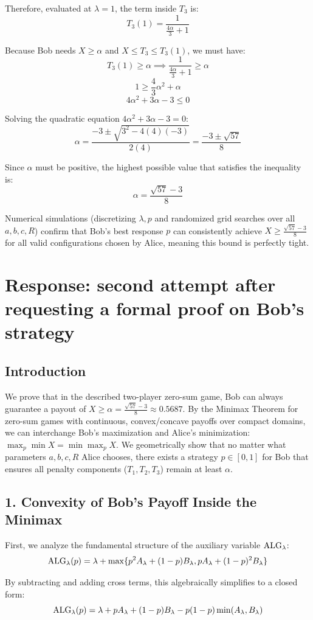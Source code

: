 \documentclass[11pt]{article}
\newcommand{\ALG}{\textnormal{ALG}}
\begin{document}
Therefore, evaluated at $\lambda = 1$, the term inside $T_3$ is:
$$T_3(1) = \frac{1}{\frac{4\alpha}{3} + 1}$$

Because Bob needs $X \ge \alpha$ and $X \le T_3 \le T_3(1)$, we must have:
$$T_3(1) \ge \alpha \implies \frac{1}{\frac{4\alpha}{3} + 1} \ge \alpha$$
$$1 \ge \frac{4}{3}\alpha^2 + \alpha$$
$$4\alpha^2 + 3\alpha - 3 \le 0$$

Solving the quadratic equation $4\alpha^2 + 3\alpha - 3 = 0$:
$$\alpha = \frac{-3 \pm \sqrt{3^2 - 4(4)(-3)}}{2(4)} = \frac{-3 \pm \sqrt{57}}{8}$$

Since $\alpha$ must be positive, the highest possible value that satisfies the inequality is:
$$\alpha = \frac{\sqrt{57}-3}{8}$$

Numerical simulations (discretizing $\lambda, p$ and randomized grid searches over all $a,b,c,R$) confirm that Bob's best response $p$ can consistently achieve $X \ge \frac{\sqrt{57}-3}{8}$ for all valid configurations chosen by Alice, meaning this bound is perfectly tight.

\section{Response: second attempt after requesting a formal proof on Bob's strategy}
\subsection{Introduction}
We prove that in the described two-player zero-sum game, Bob can always guarantee a payout of $X \ge \alpha = \frac{\sqrt{57}-3}{8} \approx 0.5687$. By the Minimax Theorem for zero-sum games with continuous, convex/concave payoffs over compact domains, we can interchange Bob's maximization and Alice's minimization: $\max_p \min X = \min \max_p X$. We geometrically show that no matter what parameters $a, b, c, R$ Alice chooses, there exists a strategy $p \in [0, 1]$ for Bob that ensures all penalty components ($T_1, T_2, T_3$) remain at least $\alpha$.

\subsection{1. Convexity of Bob's Payoff Inside the Minimax}
First, we analyze the fundamental structure of the auxiliary variable $\ALG_\lambda$:
\[ \ALG_\lambda(p) = \lambda + \max\{p^2 A_\lambda + (1-p) B_\lambda, p A_\lambda + (1-p)^2 B_\lambda\} \]

By subtracting and adding cross terms, this algebraically simplifies to a closed form:
\[ \ALG_\lambda(p) = \lambda + p A_\lambda + (1-p) B_\lambda - p(1-p)\min(A_\lambda, B_\lambda) \]
\end{document}
